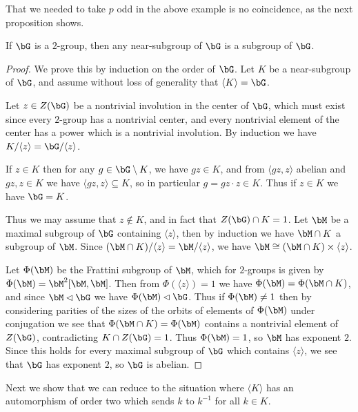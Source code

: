 That we needed to take $p$ odd in the above example is no coincidence, as the next proposition shows.

\begin{prop} If $\bG$ is a $2$-group, then any near-subgroup of $\bG$ is a subgroup of $\bG$.
\end{prop}
\begin{proof} We prove this by induction on the order of $\bG$. Let $K$ be a near-subgroup of $\bG$, and assume without loss of generality that $\langle K\rangle = \bG$.%

Let $z \in Z(\bG)$ be a nontrivial involution in the center of $\bG$, which must exist since every $2$-group has a nontrivial center, and every nontrivial element of the center has a power which is a nontrivial involution. By induction we have $K/\langle z\rangle = \bG/\langle z\rangle$.

If $z \in K$ then for any $g \in \bG\setminus K$, we have $gz \in K$, and from $\langle gz,z\rangle$ abelian and $gz,z \in K$ we have $\langle gz,z\rangle \subseteq K$, so in particular $g = gz\cdot z \in K$. Thus if $z \in K$ we have $\bG = K$.

Thus we may assume that $z \not\in K$, and in fact that $Z(\bG) \cap K = 1$. Let $\bM$ be a maximal subgroup of $\bG$ containing $\langle z\rangle$, then by induction we have $\bM \cap K$ a subgroup of $\bM$. Since $(\bM \cap K)/\langle z\rangle = \bM/\langle z\rangle$, we have $\bM \cong (\bM\cap K)\times \langle z\rangle$.

Let $\Phi(\bM)$ be the Frattini subgroup of $\bM$, which for $2$-groups is given by $\Phi(\bM) = \bM^2[\bM,\bM]$. Then from $\Phi(\langle z\rangle) = 1$ we have $\Phi(\bM) = \Phi(\bM\cap K)$, and since $\bM \lhd \bG$ we have $\Phi(\bM) \lhd \bG$. Thus if $\Phi(\bM) \ne 1$ then by considering parities of the sizes of the orbits of elements of $\Phi(\bM)$ under conjugation we see that $\Phi(\bM \cap K) = \Phi(\bM)$ contains a nontrivial element of $Z(\bG)$, contradicting $K \cap Z(\bG) = 1$. Thus $\Phi(\bM) = 1$, so $\bM$ has exponent $2$. Since this holds for every maximal subgroup of $\bG$ which contains $\langle z\rangle$, we see that $\bG$ has exponent $2$, so $\bG$ is abelian.
\end{proof}

Next we show that we can reduce to the situation where $\langle K\rangle$ has an automorphism of order two which sends $k$ to $k^{-1}$ for all $k \in K$.

